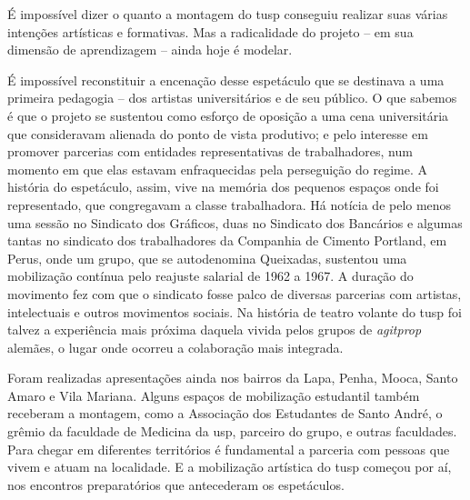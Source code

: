 É impossível dizer o quanto a montagem do {\sc tusp} conseguiu realizar suas
várias intenções artísticas e formativas. Mas a radicalidade do projeto
-- em sua dimensão de aprendizagem -- ainda hoje é modelar.

\subject{Cenas de um\\ experimento}

É impossível reconstituir a encenação desse espetáculo que se destinava
a uma primeira pedagogia -- dos artistas universitários e de seu público.
O que sabemos é que o projeto se sustentou como esforço de oposição a
uma cena universitária que consideravam alienada do ponto de vista
produtivo; e pelo interesse em promover parcerias com entidades
representativas de trabalhadores, num momento em que elas estavam
enfraquecidas pela perseguição do regime. A história do espetáculo,
assim, vive na memória dos pequenos espaços onde foi representado, que
congregavam a classe trabalhadora. Há notícia de pelo menos uma sessão
no Sindicato dos Gráficos, duas no Sindicato dos Bancários e algumas
tantas no sindicato dos trabalhadores da Companhia de Cimento Portland,
em Perus, onde um grupo, que se autodenomina Queixadas, sustentou uma
mobilização contínua pelo reajuste salarial de 1962 a 1967. A duração do
movimento fez com que o sindicato fosse palco de diversas parcerias com
artistas, intelectuais e outros movimentos sociais. Na história de
teatro volante do {\sc tusp} foi talvez a experiência mais próxima daquela
vivida pelos grupos de {\it agitprop} alemães, o lugar onde ocorreu a
colaboração mais integrada.


Foram realizadas apresentações ainda nos bairros da Lapa, Penha, Mooca,
Santo Amaro e Vila Mariana. Alguns espaços de mobilização estudantil
também receberam a montagem, como a Associação dos Estudantes de Santo
André, o grêmio da faculdade de Medicina da {\sc usp}, parceiro do grupo, e
outras faculdades. Para chegar em diferentes territórios é fundamental a
parceria com pessoas que vivem e atuam na localidade. E a mobilização
artística do {\sc tusp} começou por aí, nos encontros preparatórios que
antecederam os espetáculos.


